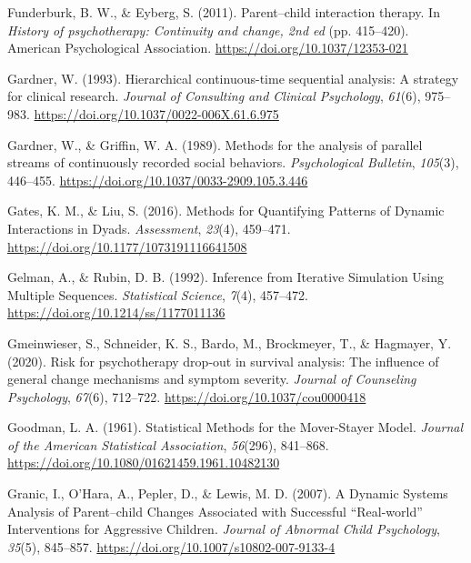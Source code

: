 \documentclass[12pt]{./styles/outhesis}
\begin{document}
\leavevmode{}%
Funderburk, B. W., \& Eyberg, S. (2011). Parent--child interaction
therapy. In \emph{History of psychotherapy: {Continuity} and change, 2nd
ed} (pp. 415--420). American Psychological Association.
\url{https://doi.org/10.1037/12353-021}

\leavevmode{}%
Gardner, W. (1993). Hierarchical continuous-time sequential analysis:
{A} strategy for clinical research. \emph{Journal of Consulting and
Clinical Psychology}, \emph{61}(6), 975--983.
\url{https://doi.org/10.1037/0022-006X.61.6.975}

\leavevmode{}%
Gardner, W., \& Griffin, W. A. (1989). Methods for the analysis of
parallel streams of continuously recorded social behaviors.
\emph{Psychological Bulletin}, \emph{105}(3), 446--455.
\url{https://doi.org/10.1037/0033-2909.105.3.446}

\leavevmode{}%
Gates, K. M., \& Liu, S. (2016). Methods for {Quantifying Patterns} of
{Dynamic Interactions} in {Dyads}. \emph{Assessment}, \emph{23}(4),
459--471. \url{https://doi.org/10.1177/1073191116641508}

\leavevmode{}%
Gelman, A., \& Rubin, D. B. (1992). Inference from {Iterative Simulation
Using Multiple Sequences}. \emph{Statistical Science}, \emph{7}(4),
457--472. \url{https://doi.org/10.1214/ss/1177011136}

\leavevmode{}%
Gmeinwieser, S., Schneider, K. S., Bardo, M., Brockmeyer, T., \&
Hagmayer, Y. (2020). Risk for psychotherapy drop-out in survival
analysis: {The} influence of general change mechanisms and symptom
severity. \emph{Journal of Counseling Psychology}, \emph{67}(6),
712--722. \url{https://doi.org/10.1037/cou0000418}

\leavevmode{}%
Goodman, L. A. (1961). Statistical {Methods} for the {Mover-Stayer
Model}. \emph{Journal of the American Statistical Association},
\emph{56}(296), 841--868.
\url{https://doi.org/10.1080/01621459.1961.10482130}

\leavevmode{}%
Granic, I., O'Hara, A., Pepler, D., \& Lewis, M. D. (2007). A {Dynamic
Systems Analysis} of {Parent}--child {Changes Associated} with
{Successful} {``{Real-world}''} {Interventions} for {Aggressive
Children}. \emph{Journal of Abnormal Child Psychology}, \emph{35}(5),
845--857. \url{https://doi.org/10.1007/s10802-007-9133-4}
\end{document}
